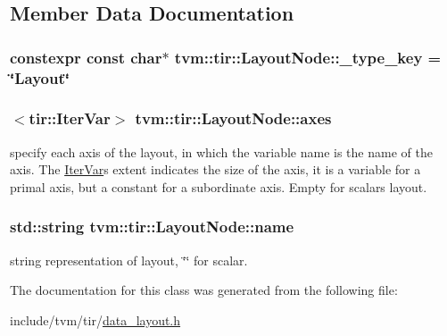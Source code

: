 \subsection{Member Data Documentation}
\subsubsection[{\texorpdfstring{\+\_\+type\+\_\+key}{_type_key}}]{\setlength{\rightskip}{0pt plus 5cm}constexpr const char$\ast$ tvm\+::tir\+::\+Layout\+Node\+::\+\_\+type\+\_\+key = \char`\"{}Layout\char`\"{}\hspace{0.3cm}{\ttfamily [static]}}\hypertarget{classtvm_1_1tir_1_1LayoutNode_aaca4fc16e14cb9867cd9f3564b4dd59f}{}\label{classtvm_1_1tir_1_1LayoutNode_aaca4fc16e14cb9867cd9f3564b4dd59f}
\subsubsection[{\texorpdfstring{axes}{axes}}]{$<${\bf tir\+::\+Iter\+Var}$>$ tvm\+::tir\+::\+Layout\+Node\+::axes}\hypertarget{classtvm_1_1tir_1_1LayoutNode_a4287f43c0ae133205d9803f4fadc3d88}{}\label{classtvm_1_1tir_1_1LayoutNode_a4287f43c0ae133205d9803f4fadc3d88}


specify each axis of the layout, in which the variable name is the name of the axis. The \hyperlink{classtvm_1_1tir_1_1IterVar}{Iter\+Var}\textquotesingle{}s extent indicates the size of the axis, it is a variable for a primal axis, but a constant for a subordinate axis. Empty for scalar\textquotesingle{}s layout. 

\subsubsection[{\texorpdfstring{name}{name}}]{\setlength{\rightskip}{0pt plus 5cm}std\+::string tvm\+::tir\+::\+Layout\+Node\+::name}\hypertarget{classtvm_1_1tir_1_1LayoutNode_a7cdbaa55c5e21044c01fd99d46096140}{}\label{classtvm_1_1tir_1_1LayoutNode_a7cdbaa55c5e21044c01fd99d46096140}


string representation of layout, \char`\"{}\char`\"{} for scalar. 



The documentation for this class was generated from the following file\+:\begin{DoxyCompactItemize}
\item 
include/tvm/tir/\hyperlink{data__layout_8h}{data\+\_\+layout.\+h}\end{DoxyCompactItemize}
